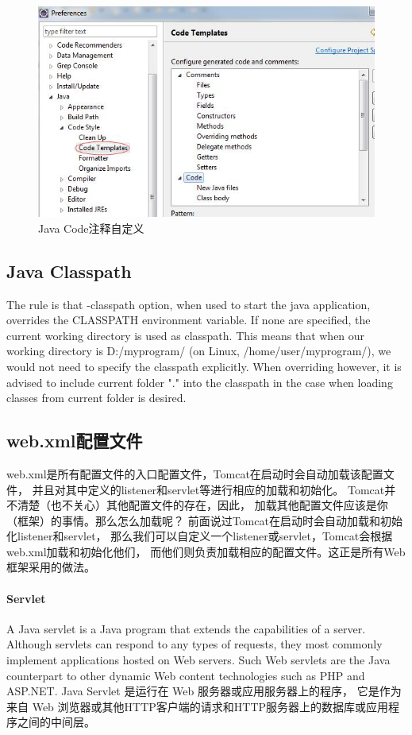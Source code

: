 \documentclass{book}
\begin{document}
\begin{figure}[htbp]
	\centering
	\includegraphics[scale=0.6]{JavaCodeTemplate.jpg}
	\caption{Java Code注释自定义}
	\label{code:JavaCodeTemplate}
\end{figure}

\subsection{Java Classpath}

The rule is that -classpath option, when used to start the java application, 
overrides the CLASSPATH environment variable. If none are specified, 
the current working directory is used as classpath. 
This means that when our working directory is D:/myprogram/ (on Linux, /home/user/myprogram/), 
we would not need to specify the classpath explicitly. When overriding however, 
it is advised to include current folder "." into the classpath 
in the case when loading classes from current folder is desired.

\subsection{web.xml配置文件}

web.xml是所有配置文件的入口配置文件，Tomcat在启动时会自动加载该配置文件，
并且对其中定义的listener和servlet等进行相应的加载和初始化。
Tomcat并不清楚（也不关心）其他配置文件的存在，因此，
加载其他配置文件应该是你（框架）的事情。那么怎么加载呢？
前面说过Tomcat在启动时会自动加载和初始化listener和servlet，
那么我们可以自定义一个listener或servlet，Tomcat会根据web.xml加载和初始化他们，
而他们则负责加载相应的配置文件。这正是所有Web框架采用的做法。


\paragraph{Servlet}
A Java servlet is a Java program that extends the capabilities of a server. 
Although servlets can respond to any types of requests, 
they most commonly implement applications hosted on Web servers.
Such Web servlets are the Java counterpart to other dynamic 
Web content technologies such as PHP and ASP.NET.
Java Servlet 是运行在 Web 服务器或应用服务器上的程序，
它是作为来自 Web 浏览器或其他HTTP客户端的请求和HTTP服务器上的数据库或应用程序之间的中间层。
\end{document}
